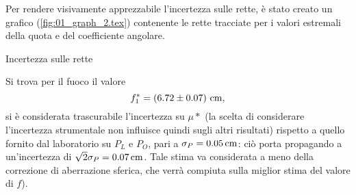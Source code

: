 Per rendere visivamente apprezzabile l'incertezza sulle rette, \`e stato creato un grafico (\autoref{fig:01_graph_2.tex}) contenente le rette tracciate per i valori estremali della quota e del coefficiente angolare.
\begin{grafico} \centering  \caption{Incertezza sulle rette} \label{fig:01_graph_2.tex} \end{grafico}

Si trova per il fuoco il valore 
\[ f^*_1=\left(6.72 \pm 0.07\right) \,\mathrm{cm} , \] 
si \`e considerata trascurabile l'incertezza su $\mu*$ (la scelta di considerare l'incertezza strumentale non influisce quindi sugli altri risultati) rispetto a quello fornito dal laboratorio su $P_L$ e $P_O$, pari a $\sigma _P = 0.05 \,\mathrm{cm}$: ci\`o porta propagando a un'incertezza di $\sqrt{2}   \sigma_P = 0.07 \,\mathrm{cm}$. Tale stima va considerata a meno della correzione di aberrazione sferica, che verr\`a compiuta sulla miglior stima del valore di $f$).

